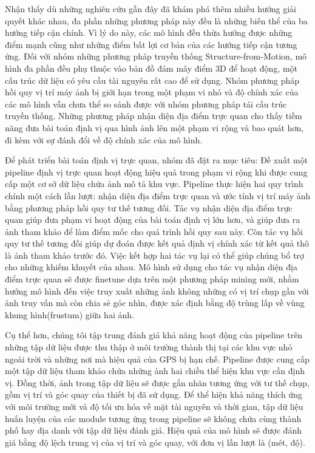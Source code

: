 Nhận thấy dù những nghiên cứu gần đây đã khám phá thêm nhiều hướng giải quyết khác nhau, đa phần những phương pháp này đều là những biến thể của ba hướng tiếp cận chính. Vì lý do này, các mô hình đều thừa hưởng được những điểm mạnh cũng như những điểm bất lợi cơ bản của các hướng tiếp cận tương ứng. Đối với nhóm những phương pháp truyền thống Structure-from-Motion, mô hình đa phần đều phụ thuộc vào bản đồ đám mây điểm 3D để hoạt động, một cấu trúc dữ liệu có yêu cầu tài nguyên rất cao để sử dụng. Nhóm phương pháp hồi quy vị trí máy ảnh bị giới hạn trong một phạm vi nhỏ và độ chính xác của các mô hình vẫn chưa thể so sánh được với nhóm phương pháp tái cấu trúc truyền thống. Những phương pháp nhận diện địa điểm trực quan cho thấy tiềm năng đưa bài toán định vị qua hình ảnh lên một phạm vi rộng và bao quát hơn, đi kèm với sự đánh đổi về độ chính xác của mô hình.

Để phát triển bài toán định vị trực quan, nhóm đã đặt ra mục tiêu: Đề xuất một pipeline định vị trực quan hoạt động hiệu quả trong phạm vi rộng khi được cung cấp một cơ sở dữ liệu chứa ảnh mô tả khu vực. Pipeline thực hiện hai quy trình chính một cách lần lượt: nhận diện địa điểm trực quan và ước tính vị trí máy ảnh bằng phương pháp hồi quy tư thế tương đối. Tác vụ nhận diện địa điểm trực quan giúp đưa phạm vi hoạt động của bài toán định vị lớn hơn, và giúp đưa ra ảnh tham khảo để làm điểm mốc cho quá trình hồi quy sau này. Còn tác vụ hồi quy tư thế tương đối giúp dự đoán được kết quả định vị chính xác từ kết quả thô là ảnh tham khảo trước đó. Việc kết hợp hai tác vụ lại có thể giúp chúng bổ trợ cho những khiếm khuyết của nhau. Mô hình sử dụng cho tác vụ nhận diện địa điểm trực quan sẽ được finetune dựa trên một phương pháp mining mới, nhằm hướng mô hình đến việc truy xuất những ảnh không những có vị trí chụp gần với ảnh truy vấn mà còn chia sẻ góc nhìn, được xác định bằng độ trùng lấp về vùng khung hình(frustum) giữa hai ảnh.

Cụ thể hơn, chúng tôi tập trung đánh giá khả năng hoạt động của pipeline trên những tập dữ liệu được thu thập ở môi trường thành thị tại các khu vực nhỏ ngoài trời và những nơi mà hiệu quả của GPS bị hạn chế. Pipeline được cung cấp một tập dữ liệu tham khảo chứa những ảnh hai chiều thể hiện khu vực cần định vị. Đồng thời, ảnh trong tập dữ liệu sẽ được gắn nhãn tương ứng với tư thế chụp, gồm vị trí và góc quay của thiết bị đã sử dụng. Để thể hiện khả năng thích ứng với môi trường mới và độ tối ưu hóa về mặt tài nguyên và thời gian, tập dữ liệu huấn luyện của các module tương ứng trong pipeline sẽ không chứa cùng thành phố hay địa danh với tập dữ liệu đánh giá. Hiệu quả của mô hình sẽ được đánh giá bằng độ lệch trung vị của vị trí và góc quay, với đơn vị lần lượt là (mét, độ).

